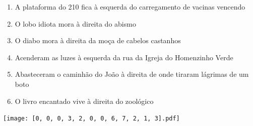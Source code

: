\documentclass[12pt]{article}
\begin{document}
		 

\pagebreak


	\begin{enumerate}
		  \sffamily %
		  \large %


\vfill \item
A plataforma do 210 fica	%
à esquerda
do carregamento de vacinas vencendo	%

\vfill \item
O lobo idiota mora	%
à direita
do abismo	%

\vfill \item
O diabo mora	%
à direita
da moça de cabelos castanhos	%

\vfill \item
Acenderam as luzes	%
à esquerda
da rua da Igreja do Homenzinho Verde	%

\vfill \item
Abasteceram o caminhão do João	%
à direita
de onde tiraram lágrimas de um boto	%

\vfill \item
O livro encantado vive	%
à direita
do zoológico	%
	\end{enumerate}
		  
		  \hfill

		  \vfill

\texttt{[image: [0, 0, 0, 3, 2, 0, 0, 6, 7, 2, 1, 3].pdf]}


	\hfill	  	  


\pagebreak			
\end{document}
